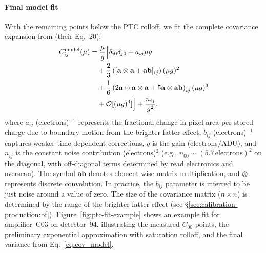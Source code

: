 \paragraph{Final model fit}
With the remaining points below the PTC rolloff, we fit the complete covariance expansion from \citet{2019A&A...629A..36A} (their Eq.~20):
\begin{equation}
    \begin{aligned}
    C_{ij}^{\mathrm{model}}(\mu) &= \frac{\mu}{g} \Bigl[ \delta_{i0}\delta_{j0} + a_{ij}\mu g \\
      &\quad + \frac{2}{3}\left([\mathbf{a}\otimes\mathbf{a} + \mathbf{ab}]_{ij}\right)(\mu g)^{2} \\
      &\quad + \frac{1}{6}\left(2\mathbf{a}\otimes\mathbf{a}\otimes\mathbf{a} + 5\mathbf{a}\otimes\mathbf{ab}\right)_{ij}(\mu g)^{3} \\
      &\quad + \mathcal{O}[(\mu g)^4] \Bigr] + \frac{n_{ij}}{g^2},
    \end{aligned}
    \label{eq:cov_model}
\end{equation}
where $a_{ij}$ (electrons)$^{-1}$ represents the fractional change in pixel area per stored charge due to boundary motion from the brighter-fatter effect, $b_{ij}$ (electrons)$^{-1}$ captures weaker time-dependent corrections, $g$ is the gain (electrons$/\mathrm{ADU}$), and $n_{ij}$ is the constant noise contribution (electrons)$^2$ (e.g., $n_{00}\sim (5.7\,\mathrm{electrons})^{2}$ on the diagonal, with off-diagonal terms determined by read electronics and overscan).
The symbol $\mathbf{ab}$ denotes element-wise matrix multiplication, and $\otimes$ represents discrete convolution.
In practice, the $b_{ij}$ parameter is inferred to be just noise around a value of zero.
The size of the covariance matrix ($n \times n$) is determined by the range of the brighter-fatter effect (see \S\ref{sec:calibration-production:bf}).
Figure~\ref{fig:ptc-fit-example} shows an example fit for amplifier~C03 on detector~94, illustrating the measured $C_{00}$ points, the preliminary exponential approximation with saturation rolloff, and the final variance from Eq.~\ref{eq:cov_model}.

